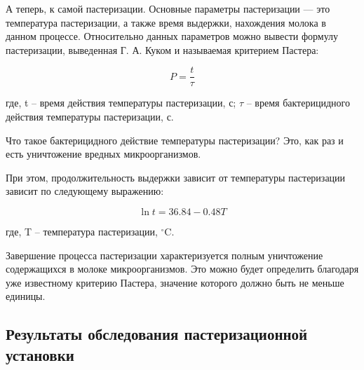 {  \par А теперь, к самой пастеризации. Основные параметры пастеризации — это температура пастеризации, а также время выдержки, нахождения молока в данном процессе. Относительно данных параметров можно вывести формулу пастеризации, выведенная Г. А. Куком и называемая критерием Пастера:
  \par

  \[P=\frac{t}{\tau}\]

  где, t {--} время действия температуры пастеризации, с; $\tau$ {--} время бактерицидного действия температуры пастеризации, с.

  \par Что такое бактерицидного действие температуры пастеризации? Это, как раз и есть уничтожение вредных микроорганизмов. 

  \par При этом, продолжительность выдержки зависит от температуры пастеризации зависит по следующему выражению: 
  \par

  \[\ln{t} = 36.84 - 0.48T\]

  где, T {--} температура пастеризации, $^{\circ}$C.

  \par Завершение процесса пастеризации характеризуется полным уничтожение содержащихся в молоке микроорганизмов. Это можно будет определить благодаря уже известному критерию Пастера, значение которого должно быть не меньше единицы. 
  \par %
}


\subsection*{Результаты обследования пастеризационной установки} %


